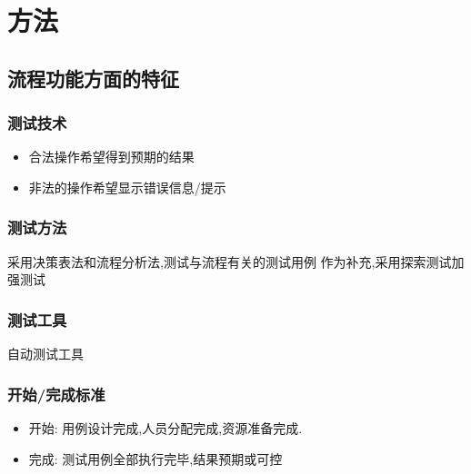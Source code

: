 \documentclass[hyperref, a4paper]{ctexart}
\providecommand{\tightlist}{%
  \setlength{\itemsep}{0pt}\setlength{\parskip}{0pt}}
\begin{document}
\hypertarget{ux65b9ux6cd5}{%
\section{方法}\label{ux65b9ux6cd5}}

\hypertarget{ux6d41ux7a0bux529fux80fdux65b9ux9762ux7684ux7279ux5f81}{%
\subsection{流程功能方面的特征}\label{ux6d41ux7a0bux529fux80fdux65b9ux9762ux7684ux7279ux5f81}}

\hypertarget{ux6d4bux8bd5ux6280ux672f}{%
\subsubsection{测试技术}\label{ux6d4bux8bd5ux6280ux672f}}

\begin{itemize}
\tightlist
\item
  合法操作希望得到预期的结果
\item
  非法的操作希望显示错误信息/提示
\end{itemize}

\hypertarget{ux6d4bux8bd5ux65b9ux6cd5}{%
\subsubsection{测试方法}\label{ux6d4bux8bd5ux65b9ux6cd5}}

采用决策表法和流程分析法,测试与流程有关的测试用例
作为补充,采用探索测试加强测试

\hypertarget{ux6d4bux8bd5ux5de5ux5177}{%
\subsubsection{测试工具}\label{ux6d4bux8bd5ux5de5ux5177}}

自动测试工具

\hypertarget{ux5f00ux59cbux5b8cux6210ux6807ux51c6}{%
\subsubsection{开始/完成标准}\label{ux5f00ux59cbux5b8cux6210ux6807ux51c6}}

\begin{itemize}
\tightlist
\item
  开始: 用例设计完成,人员分配完成,资源准备完成.
\item
  完成: 测试用例全部执行完毕,结果预期或可控
\end{itemize}
\end{document}
